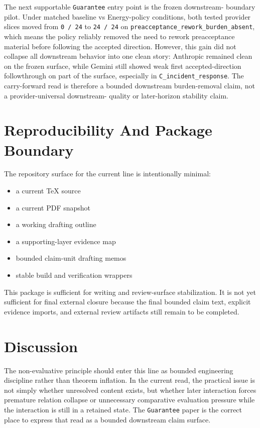 \documentclass[11pt]{article}
\begin{document}
The next supportable \texttt{Guarantee} entry point is the frozen downstream-
boundary pilot. Under matched baseline vs Energy-policy conditions, both tested
provider slices moved from \texttt{0 / 24} to \texttt{24 / 24} on
\texttt{preacceptance\_rework\_burden\_absent}, which means the policy reliably
removed the need to rework preacceptance material before following the accepted
direction. However, this gain did not collapse all downstream behavior into one
clean story: Anthropic remained clean on the frozen surface, while Gemini still
showed weak first accepted-direction followthrough on part of the surface,
especially in \texttt{C\_incident\_response}. The carry-forward read is therefore
a bounded downstream burden-removal claim, not a provider-universal downstream-
quality or later-horizon stability claim.

\section{Reproducibility And Package Boundary}

The repository surface for the current line is intentionally minimal:
\begin{itemize}
\item a current TeX source
\item a current PDF snapshot
\item a working drafting outline
\item a supporting-layer evidence map
\item bounded claim-unit drafting memos
\item stable build and verification wrappers
\end{itemize}

This package is sufficient for writing and review-surface stabilization. It is not
yet sufficient for final external closure because the final bounded claim text,
explicit evidence imports, and external review artifacts still remain to be
completed.

\section{Discussion}

The non-evaluative principle should enter this line as bounded engineering
discipline rather than theorem inflation. In the current read, the practical issue
is not simply whether unresolved content exists, but whether later interaction
forces premature relation collapse or unnecessary comparative evaluation pressure
while the interaction is still in a retained state. The \texttt{Guarantee} paper is
the correct place to express that read as a bounded downstream claim surface.
\end{document}
